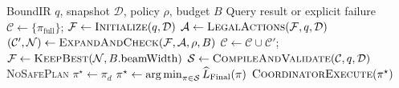 \begin{algorithm}[H]
\caption{Bounded search and safe-plan selection}
\label{alg:kart-query}
\begin{algorithmic}[1]
\Require BoundIR $q$, snapshot $\mathcal{D}$, policy $\rho$, budget $B$
\Ensure Query result or explicit failure
\State $\mathcal{C}\gets\{\pi_{\mathrm{full}}\}$; $\mathcal{F}\gets\Call{Initialize}{q,\mathcal{D}}$
  \State $\mathcal{A}\gets\Call{LegalActions}{\mathcal{F},q,\mathcal{D}}$
  \State $(\mathcal{C}',\mathcal{N})\gets\Call{ExpandAndCheck}{\mathcal{F},\mathcal{A},\rho,B}$
  \State $\mathcal{C}\gets\mathcal{C}\cup\mathcal{C}'$; $\mathcal{F}\gets\Call{KeepBest}{\mathcal{N},B.\text{beamWidth}}$
\EndWhile
\State $\mathcal{S}\gets\Call{CompileAndValidate}{\mathcal{C},q,\mathcal{D}}$
 \Return \textsc{NoSafePlan} \EndIf
{}
  \State $\pi^\star\gets\pi_d$
\Else
  \State $\pi^\star\gets\operatorname*{arg\,min}_{\pi\in\mathcal{S}}\widehat{L}_{\mathrm{Final}}(\pi)$
\EndIf
\State \Return $\Call{CoordinatorExecute}{\pi^\star}$
\end{algorithmic}
\end{algorithm}
